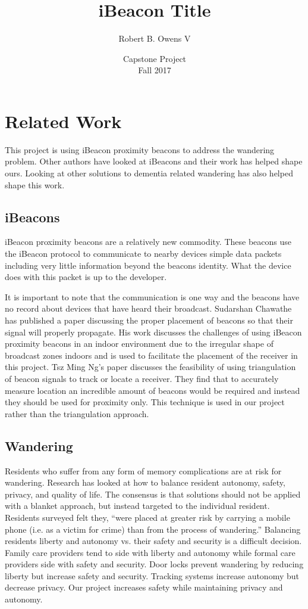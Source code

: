 \documentclass[11pt]{article}
\title{iBeacon Title}
\author{Robert B. Owens V}
\date{\small Capstone Project\\[.5em]
\small Fall 2017}
\begin{document}
\maketitle

\section{Related Work}
This project is using iBeacon proximity beacons to address the wandering problem. Other authors have looked at iBeacons and their work has helped shape ours. Looking at other solutions to dementia related wandering has also helped shape this work.
\subsection{iBeacons}
iBeacon proximity beacons are a relatively new commodity. These beacons use the iBeacon protocol to communicate to nearby devices simple data packets including very little information beyond the beacons identity. What the device does with this packet is up to the developer. 

It is important to note that the communication is one way and the beacons have no record about devices that have heard their broadcast. Sudarshan Chawathe has published a paper discussing the proper placement of beacons so that their signal will properly propagate\cite{chawathe}. His work discusses the challenges of using iBeacon proximity beacons in an indoor environment due to the irregular shape of broadcast zones indoors and is used to facilitate the placement of the receiver in this project. Tsz Ming Ng's paper discusses the feasibility of using triangulation of beacon signals to track or locate a receiver. They find that to accurately measure location an incredible amount of beacons would be required and instead they should be used for proximity only\cite{ng}. This technique is used in our project rather than the triangulation approach. 

\subsection{Wandering}
Residents who suffer from any form of memory complications are at risk for wandering. Research has looked at how to balance resident autonomy, safety, privacy, and quality of life\cite{robinson}. The consensus is that solutions should not be applied with a blanket approach, but instead targeted to the individual resident. Residents surveyed felt they, ``were placed at greater risk by carrying a mobile phone (i.e. as a victim for crime) than from the process of wandering.''\cite{robinson} Balancing residents liberty and autonomy vs. their safety and security is a difficult decision. Family care providers tend to side with liberty and autonomy while formal care providers side with safety and security. Door locks prevent wandering by reducing liberty but increase safety and security. Tracking systems increase autonomy but decrease privacy. Our project increases safety while maintaining privacy and autonomy. 
\end{document}
